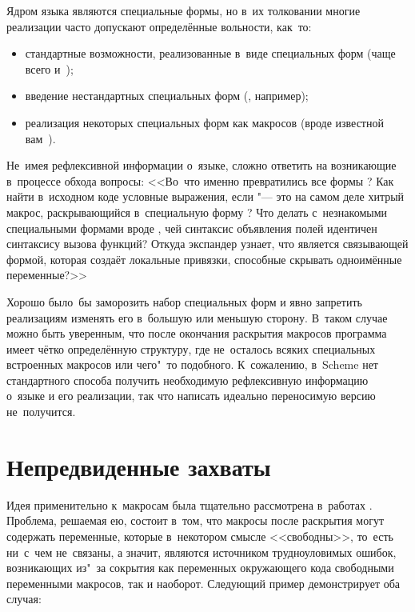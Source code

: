 Ядром языка являются специальные формы, но в~их толковании многие реализации
часто допускают определённые вольности, как~то:

\begin{itemize}
  \item стандартные возможности, реализованные в~виде специальных форм
        (чаще всего  и~);

  \item введение нестандартных специальных форм (,
        например);

  \item реализация некоторых специальных форм как макросов (вроде
        известной вам~).
\end{itemize}

Не~имея рефлексивной информации о~языке, сложно ответить на возникающие
в~процессе обхода вопросы: <<Во~что именно превратились все формы ?
Как найти в~исходном коде условные выражения, если  "--- это на самом
деле хитрый макрос, раскрывающийся в~специальную форму ? Что делать
с~незнакомыми специальными формами вроде , чей синтаксис
объявления полей идентичен синтаксису вызова функций? Откуда экспандер узнает,
что  является связывающей формой, которая создаёт локальные
привязки, способные скрывать одноимённые переменные?>>

Хорошо было~бы заморозить набор специальных форм и явно запретить реализациям
изменять его в~большую или меньшую сторону. В~таком случае можно быть уверенным,
что после окончания раскрытия макросов программа имеет чётко определённую
структуру, где не~осталось всяких специальных встроенных макросов или чего"~то
подобного. К~сожалению, в~Scheme нет стандартного способа получить необходимую
рефлексивную информацию о~языке и его реализации, так что написать идеально
переносимую версию  не~получится.


\section{Непредвиденные захваты}\label{macros/sect:hygiene}

Идея  применительно к~макросам была тщательно рассмотрена
в~работах \cite{kffd86,br88,cr91a}. Проблема, решаемая ею, состоит в~том, что
макросы после раскрытия могут содержать переменные, которые в~некотором
смысле <<свободны>>, то~есть ни~с~чем не~связаны, а значит, являются источником
трудноуловимых ошибок, возникающих из"~за сокрытия как переменных окружающего
кода свободными переменными макросов, так и наоборот. Следующий пример
демонстрирует оба случая:

